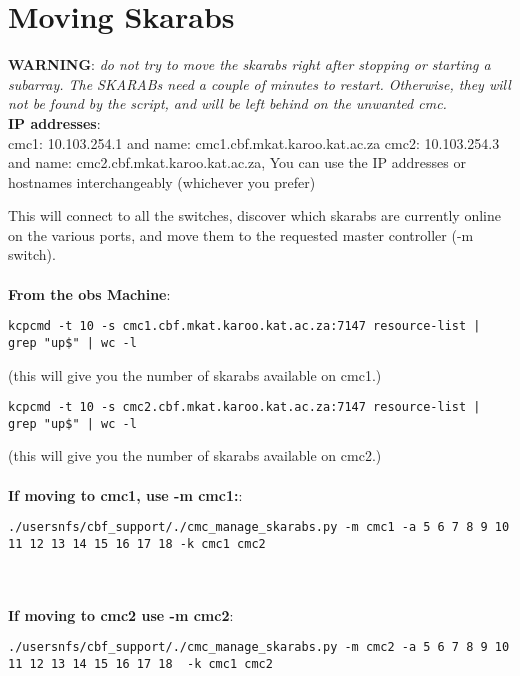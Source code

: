 \section{Moving Skarabs}


\textbf{WARNING}:\textit{ do not try to move the skarabs right after stopping or starting a subarray. The SKARABs need a couple of minutes to restart. Otherwise, they will not be found by the script, and will be left behind on the unwanted cmc.}\\

\textbf{IP addresses}:\\
cmc1: 10.103.254.1 and name: cmc1.cbf.mkat.karoo.kat.ac.za 
cmc2: 10.103.254.3 and name: cmc2.cbf.mkat.karoo.kat.ac.za, 
You can use the IP addresses or hostnames interchangeably (whichever you prefer) 

This will connect to all the switches, discover which skarabs are currently online on the various ports, and move them to the requested master controller (-m switch).\\
\\
\textbf{From the obs Machine}:

\begin{lstlisting}[style=DOS]
kcpcmd -t 10 -s cmc1.cbf.mkat.karoo.kat.ac.za:7147 resource-list | grep "up$" | wc -l
\end{lstlisting}
(this will give you the number of skarabs available on cmc1.) 
\begin{lstlisting}[style=DOS]
kcpcmd -t 10 -s cmc2.cbf.mkat.karoo.kat.ac.za:7147 resource-list | grep "up$" | wc -l
\end{lstlisting}
(this will give you the number of skarabs available on cmc2.) \\
\\
\textbf{If moving to cmc1, use -m cmc1:}:
\begin{lstlisting}[style=DOS]
./usersnfs/cbf_support/./cmc_manage_skarabs.py -m cmc1 -a 5 6 7 8 9 10 11 12 13 14 15 16 17 18 -k cmc1 cmc2
\end{lstlisting}\\
\\
\textbf{If moving to cmc2 use -m cmc2}:
\begin{lstlisting}[style=DOS]
./usersnfs/cbf_support/./cmc_manage_skarabs.py -m cmc2 -a 5 6 7 8 9 10 11 12 13 14 15 16 17 18  -k cmc1 cmc2
\end{lstlisting}











